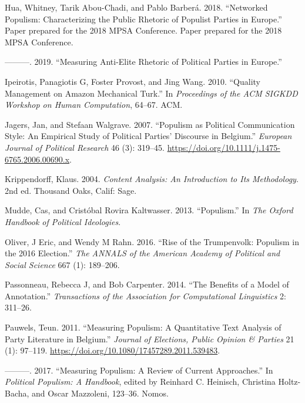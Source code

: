 \documentclass[12pt,]{article}
\begin{document}
\leavevmode\hypertarget{ref-hua_networked_2018}{}%
Hua, Whitney, Tarik Abou-Chadi, and Pablo Barberá. 2018. ``Networked
Populism: Characterizing the Public Rhetoric of Populist Parties in
Europe.'' Paper prepared for the 2018 MPSA Conference. Paper prepared
for the 2018 MPSA Conference.

\leavevmode\hypertarget{ref-hua_measuring_2019}{}%
---------. 2019. ``Measuring Anti-Elite Rhetoric of Political Parties in
Europe.''

\leavevmode\hypertarget{ref-ipeirotis_quality_2010}{}%
Ipeirotis, Panagiotis G, Foster Provost, and Jing Wang. 2010. ``Quality
Management on Amazon Mechanical Turk.'' In \emph{Proceedings of the ACM
SIGKDD Workshop on Human Computation}, 64--67. ACM.

\leavevmode\hypertarget{ref-jagers_populism_2007}{}%
Jagers, Jan, and Stefaan Walgrave. 2007. ``Populism as Political
Communication Style: An Empirical Study of Political Parties' Discourse
in Belgium.'' \emph{European Journal of Political Research} 46 (3):
319--45. \url{https://doi.org/10.1111/j.1475-6765.2006.00690.x}.

\leavevmode\hypertarget{ref-krippendorff_content_2004}{}%
Krippendorff, Klaus. 2004. \emph{Content Analysis: An Introduction to
Its Methodology}. 2nd ed. Thousand Oaks, Calif: Sage.

\leavevmode\hypertarget{ref-mudde_populism_2013}{}%
Mudde, Cas, and Cristóbal Rovira Kaltwasser. 2013. ``Populism.'' In
\emph{The Oxford Handbook of Political Ideologies}.

\leavevmode\hypertarget{ref-oliver_rise_2016}{}%
Oliver, J Eric, and Wendy M Rahn. 2016. ``Rise of the Trumpenvolk:
Populism in the 2016 Election.'' \emph{The ANNALS of the American
Academy of Political and Social Science} 667 (1): 189--206.

\leavevmode\hypertarget{ref-passonneau_benefits_2014}{}%
Passonneau, Rebecca J, and Bob Carpenter. 2014. ``The Benefits of a
Model of Annotation.'' \emph{Transactions of the Association for
Computational Linguistics} 2: 311--26.

\leavevmode\hypertarget{ref-pauwels_measuring_2011-1}{}%
Pauwels, Teun. 2011. ``Measuring Populism: A Quantitative Text Analysis
of Party Literature in Belgium.'' \emph{Journal of Elections, Public
Opinion \& Parties} 21 (1): 97--119.
\url{https://doi.org/10.1080/17457289.2011.539483}.

\leavevmode\hypertarget{ref-pauwels_measuring_2017}{}%
---------. 2017. ``Measuring Populism: A Review of Current Approaches.''
In \emph{Political Populism: A Handbook}, edited by Reinhard C.
Heinisch, Christina Holtz-Bacha, and Oscar Mazzoleni, 123--36. Nomos.
\end{document}

